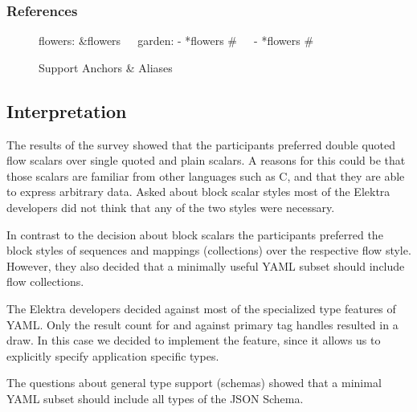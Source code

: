 \subsubsection{References}

\begin{figure}[H]
  \begin{minipage}[t]{0.48\textwidth}
    \vspace{0pt}
    \begin{bchart}[max=9, width=0.85\textwidth]
    \end{bchart}
  \end{minipage}
  \begin{minipage}[t]{0.48\textwidth}
    \vspace{0pt}
    \begin{yamlcode}
      flowers: &flowers
        🌳🌸🌼
      garden:
        - *flowers # 🌳🌸🌼
        - *flowers # 🌳🌸🌼
    \end{yamlcode}
  \end{minipage}
  \caption{Support Anchors \& Aliases}
\end{figure}

\subsection{Interpretation}

The results of the survey showed that the participants preferred double quoted flow scalars over single quoted and plain scalars. A reasons for this could be that those scalars are familiar from other languages such as C, and that they are able to express arbitrary data. Asked about block scalar styles most of the Elektra developers did not think that any of the two styles were necessary.

In contrast to the decision about block scalars the participants preferred the block styles of sequences and mappings (collections) over the respective flow style. However, they also decided that a minimally useful YAML subset should include flow collections.

The Elektra developers decided against most of the specialized type features of YAML. Only the result count for and against primary tag handles resulted in a draw. In this case we decided to implement the feature, since it allows us to explicitly specify application specific types.

The questions about general type support (schemas) showed that a minimal YAML subset should include all types of the JSON Schema.


